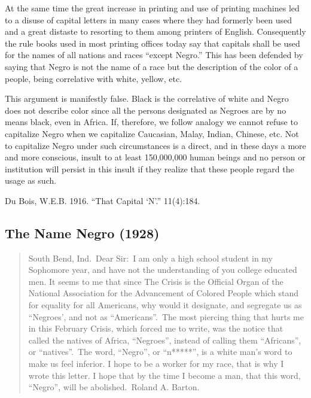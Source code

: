 \documentclass[letterpaper,10pt,english]{jupyterBook}
\begin{document}
\sphinxAtStartPar
At the same time the great increase in printing and use of printing machines led to a disuse of capital letters in many cases where they had formerly been used and a great distaste to resorting to them among printers of English. Consequently the rule books used in most printing offices today say that capitals shall be used for the names of all nations and races “except Negro.” This has been defended by saying that Negro is not the name of a race but the description of the color of a people, being correlative with white, yellow, etc.

\sphinxAtStartPar
This argument is manifestly false. Black is the correlative of white and Negro does not describe color since all the persons designated as Negroes are by no means black, even in Africa. If,  therefore, we follow analogy we cannot refuse to capitalize Negro when we capitalize Caucasian, Malay, Indian, Chinese, etc. Not to capitalize Negro under such circumstances is a direct, and in these days a more and more conscious, insult to at least 150,000,000 human beings and no person or institution will persist in this insult if they realize that these people regard the usage as such.

\sphinxAtStartPar
{} Du Bois, W.E.B. 1916. “That Capital ‘N’.” 11(4):184.


\subsection{The Name Negro (1928)}
\label{\detokenize{Volumes/35/03/name_negro:the-name-negro-1928}}\label{\detokenize{Volumes/35/03/name_negro::doc}}\begin{quote}

\sphinxAtStartPar
South Bend, Ind. Dear Sir: I am only a high school student in my Sophomore year, and have not the understanding of you college educated men. It seems to me that since The Crisis is the Official Organ of the National Association for the Advancement of Colored People which stand for equality for all Americans, why would it designate, and segregate us as “Negroes’, and not as “Americans”. The most piercing thing that hurts me in this February  Crisis, which forced me to write, was the notice that called the natives of Africa, “Negroes”, instead of calling them “Africans”, or “natives”. The word, “Negro”, or “n*****”, is a white man’s word to make us feel inferior. I hope to be a worker for my race, that is why I wrote this letter. I hope that by the time I become a man, that this word, “Negro”, will be abolished. Roland A. Barton.
\end{quote}
\end{document}
